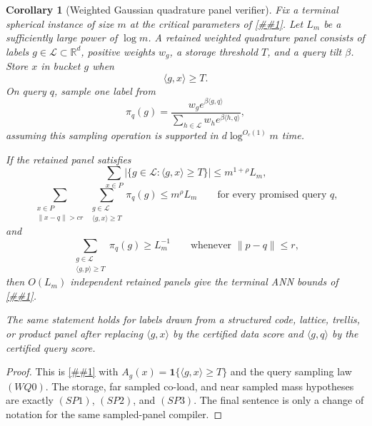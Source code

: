 \documentclass[10pt]{article}
\newcommand{\cref}[1]{\ref{##1}}
\newtheorem{corollary}[theorem]{Corollary}
\theoremstyle{definition}
\newcommand{\ip}[2]{\langle #1,#2\rangle}
\begin{document}
\begin{corollary}[Weighted Gaussian quadrature panel verifier]
   \label{cor:weighted-gaussian-quadrature-panel}
   Fix a terminal spherical instance of size \(m\) at the critical parameters
   of \cref{lem:critical-tilted-gaussian-sampled-spectrum}.  Let \(L_m\) be a
   sufficiently large power of \(\log m\).  A retained weighted quadrature
   panel consists of labels \(g\in\mathcal L\subset\mathbb R^d\), positive
   weights \(w_g\), a storage threshold \(T\), and a query tilt \(\beta\).
   Store \(x\) in bucket \(g\) when
   \[
      \ip{g}{x}\ge T.
   \]
   On query \(q\), sample one label from
   \[
      \pi_q(g)=
      \frac{w_g e^{\beta\ip{g}{q}}}
           {\sum_{h\in\mathcal L}w_h e^{\beta\ip{h}{q}}},
      \tag{WQ0}
   \]
   assuming this sampling operation is supported in \(d\log^{O_c(1)}m\) time.

   If the retained panel satisfies
   \[
      \sum_{x\in P}
      |\{g\in\mathcal L:\ip{g}{x}\ge T\}|
      \le m^{1+\rho}L_m,
      \tag{WQ1}
   \]
   \[
      \sum_{\substack{x\in P\\ \|x-q\|>cr}}
      \sum_{\substack{g\in\mathcal L\\ \ip{g}{x}\ge T}}
      \pi_q(g)
      \le m^\rho L_m
      \qquad\text{for every promised query }q,
      \tag{WQ2}
   \]
   and
   \[
      \sum_{\substack{g\in\mathcal L\\ \ip{g}{p}\ge T}}
      \pi_q(g)
      \ge L_m^{-1}
      \qquad
      \text{whenever }\|p-q\|\le r,
      \tag{WQ3}
   \]
   then \(O(L_m)\) independent retained panels give the terminal ANN bounds of
   \cref{prop:sampled-structured-panel}.

   The same statement holds for labels drawn from a structured code, lattice,
   trellis, or product panel after replacing \(\ip{g}{x}\) by the certified
   data score and \(\ip{g}{q}\) by the certified query score.
\end{corollary}

\begin{proof}
   This is \cref{prop:sampled-structured-panel} with
   \(A_g(x)=\mathbf 1\{\ip{g}{x}\ge T\}\) and the query sampling law
   \((WQ0)\).  The storage, far sampled co-load, and near sampled mass
   hypotheses are exactly \((SP1)\), \((SP2)\), and \((SP3)\).  The final
   sentence is only a change of notation for the same sampled-panel compiler.
\end{proof}
\end{document}

